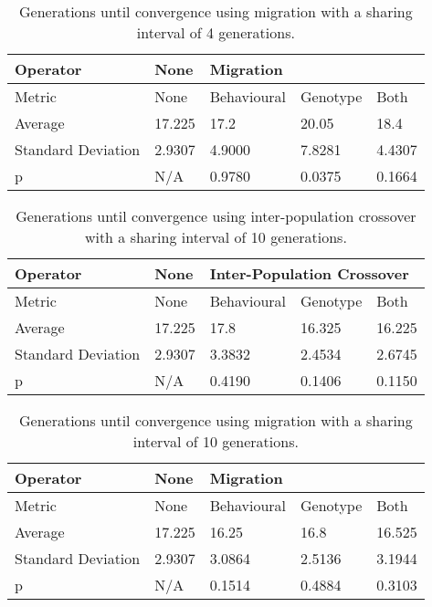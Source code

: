 \documentclass[12pt]{article} %
\begin{document}
\begin{table} \centering
    \begin{tabular}{|l|l|l|l|l|}
    \hline
    Operator			& None	& \multicolumn{3}{l|}{Migration} \\ \hline
    Metric			& None	& Behavioural	& Genotype	& Both  \\ \hline
    Average			& 17.225	& 17.2			& 20.05	& 18.4 \\ \hline
    Standard Deviation	& 2.9307	& 4.9000		& 7.8281	& 4.4307  \\ \hline
    p 				& N/A 		& 0.9780		& 0.0375	& 0.1664  \\ \hline
    \end{tabular}
    \caption{Generations until convergence using migration with a sharing interval of 4 generations.}
\end{table}

\begin{table} \centering
    \begin{tabular}{|l|l|l|l|l|}
    \hline
    Operator			& None	& \multicolumn{3}{l|}{Inter-Population Crossover} \\ \hline
    Metric			& None	& Behavioural	& Genotype	& Both  \\ \hline
    Average			& 17.225	& 17.8			& 16.325	& 16.225 \\ \hline
    Standard Deviation	& 2.9307	& 3.3832		& 2.4534	& 2.6745 \\ \hline
    p 				& N/A 		& 0.4190		& 0.1406	& 0.1150  \\ \hline
    \end{tabular}
    \caption{Generations until convergence using inter-population crossover with a sharing interval of 10 generations.}
\end{table}

\begin{table} \centering
    \begin{tabular}{|l|l|l|l|l|}
    \hline
    Operator			& None	& \multicolumn{3}{l|}{Migration} \\ \hline
    Metric			& None	& Behavioural	& Genotype	& Both  \\ \hline
    Average			& 17.225	& 16.25		& 16.8	& 16.525 \\ \hline
    Standard Deviation	& 2.9307	& 3.0864		& 2.5136	& 3.1944  \\ \hline
    p 				& N/A 		& 0.1514		& 0.4884	& 0.3103  \\ \hline
    \end{tabular}
    \caption{Generations until convergence using migration with a sharing interval of 10 generations.}
\end{table}
\end{document}
